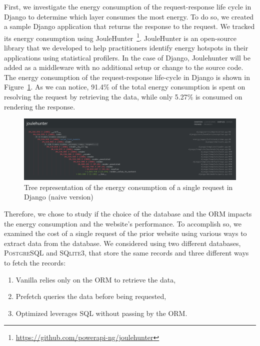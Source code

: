 First, we investigate the energy consumption of the request-response life cycle in Django to determine which layer consumes the most energy.
To do so, we created a sample Django application that returns the response to the request. We tracked its energy consumption using JouleHunter~\footnote{\url{https://github.com/powerapi-ng/joulehunter}}.
JouleHunter is an open-source library that we developed to help practitioners identify energy hotspots in their applications using statistical profilers.
In the case of Django, Joulehunter will be added as a middleware with no additional setup or change to the source code.
The energy consumption of the request-response life-cycle in Django is shown in Figure~\ref{fig:django_life_cycle_naive}.
As we can notice, 91.4\% of the total energy consumption is spent on resolving the request by retrieving the data, while only 5.27\% is consumed on rendering the response.

\begin{figure}[!htb]
    \centering
    \includegraphics[width=\linewidth]{imgs/django_life_cycle_naive}
    \caption{Tree representation of the energy consumption of a single request in Django (naive version)}
    \label{fig:django_life_cycle_naive}
\end{figure}

Therefore, we chose to study if the choice of the database and the ORM impacts the energy consumption and the website's performance.
To accomplish so, we examined the cost of a single request of the prior website using various ways to extract data from the database.
We considered using two different databases, \textsc{PostgreSQL} and \textsc{SQlite3}, that store the same records and three different ways to fetch the records:
\begin{enumerate}
    \item \textsf{Vanilla} relies only on the ORM to retrieve the data,
    \item \textsf{Prefetch} queries the data before being requested,
    \item \textsf{Optimized} leverages SQL without passing by the ORM.
\end{enumerate}

